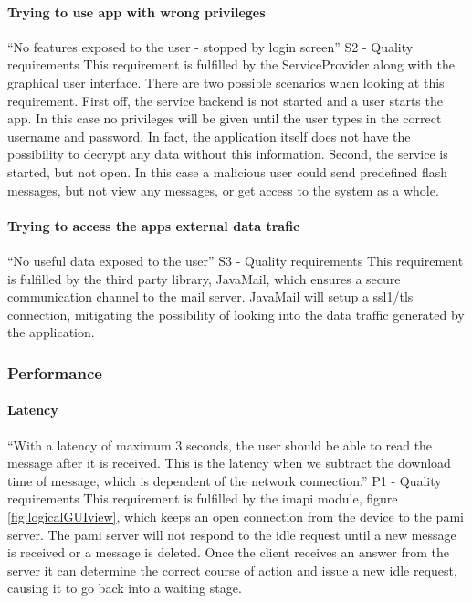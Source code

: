 \paragraph{Trying to use app with wrong privileges} \hfill
\newline
“No features exposed to the user - stopped by login screen” S2 - Quality requirements
\newline
\newline
This requirement is fulfilled by the ServiceProvider along with the graphical user interface. There are two possible scenarios when looking at this requirement. First off, the service backend is not started and a user starts the app. In this case no privileges will be given until the user types in the correct username and password. In fact, the application itself does not have the possibility to decrypt any data without this information.
Second, the service is started, but not open. In this case a malicious user could send predefined flash messages, but not view any messages, or get access to the system as a whole. 

\paragraph{Trying to access the apps external data trafic}\hfill
\newline
“No useful data exposed to the user” S3 - Quality requirements
\newline
\newline
This requirement is fulfilled by the third party library, JavaMail, which ensures a secure communication channel to the mail server. JavaMail  will setup a \gls{ssl1}/\gls{tls} connection, mitigating the possibility of looking into the data traffic generated by the application.

\subsubsection{Performance}

\paragraph{Latency}\hfill
\newline
“With a latency of maximum 3 seconds, the user should be able to read the message after it is received. This is the latency when we subtract the download time of message, which is dependent of the network connection.” P1 - Quality requirements
\newline
\newline
This requirement is fulfilled by the \gls{imapi} module, figure \ref{fig:logicalGUIview}, which keeps an open connection from the device to the \gls{pami} server. The \gls{pami} server will not respond to the \gls{idle} request until a new message is received or a message is deleted. Once the client receives an answer from the server it can determine the correct course of action and issue a new \gls{idle} request, causing it to go back into a waiting stage\cite{bib:imapi}. 